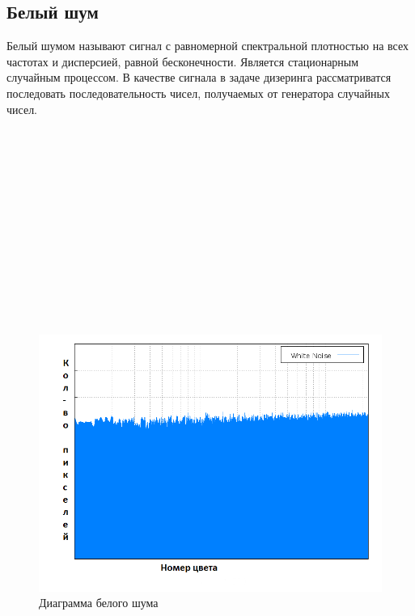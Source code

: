 \subsection{Белый шум}
Белый шумом называют сигнал с равномерной спектральной плотностью на всех частотах и дисперсией, равной бесконечности. Является стационарным случайным процессом.
В качестве сигнала в задаче дизеринга  рассматриватся последовать последовательность чисел, получаемых от генератора случайных чисел.
\\\\\\\\\\\\\\\\\\\\\\\\\\\
\begin{figure}[h!]
	\centering
	\includegraphics[width=\textwidth]{img/8_white_noise.png}
	\caption{Диаграмма белого шума}
	\label{fig:spire05}
\end{figure}

